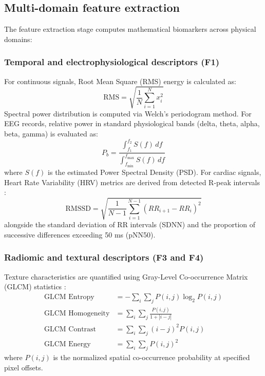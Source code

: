 \subsection{Multi-domain feature extraction}
The feature extraction stage computes mathematical biomarkers across physical domains:

\subsubsection{Temporal and electrophysiological descriptors (F1)}
For continuous signals, Root Mean Square (RMS) energy is calculated as:
\begin{equation}
\mathrm{RMS} = \sqrt{\frac{1}{N}\sum_{i=1}^{N}x_i^{2}}
\end{equation}
Spectral power distribution is computed via Welch's periodogram method. For EEG records, relative power in standard physiological bands (delta, theta, alpha, beta, gamma) is evaluated as:
\begin{equation}
P_b = \frac{\int_{f_1}^{f_2} S(f)\,df}{\int_{f_{\min}}^{f_{\max}} S(f)\,df}
\end{equation}
where $S(f)$ is the estimated Power Spectral Density (PSD). For cardiac signals, Heart Rate Variability (HRV) metrics are derived from detected R-peak intervals \cite{taskforce1996hrv, albuquerque2018ecg}:
\begin{equation}
\mathrm{RMSSD} = \sqrt{\frac{1}{N-1}\sum_{i=1}^{N-1}(RR_{i+1} - RR_i)^2}
\end{equation}
alongside the standard deviation of RR intervals (SDNN) and the proportion of successive differences exceeding 50 ms (pNN50).

\subsubsection{Radiomic and textural descriptors (F3 and F4)}
Texture characteristics are quantified using Gray-Level Co-occurrence Matrix (GLCM) statistics \cite{haralick1973glcm, lambin2012radiomics, vanGriethuysen2017pyradiomics}:
\begin{align}
\text{GLCM Entropy} & = -\sum_{i}\sum_{j} P(i,j) \log_2 P(i,j) \\
\text{GLCM Homogeneity} & = \sum_{i}\sum_{j} \frac{P(i,j)}{1 + |i - j|} \\
\text{GLCM Contrast} & = \sum_{i}\sum_{j} (i - j)^2 P(i,j) \\
\text{GLCM Energy} & = \sum_{i}\sum_{j} P(i,j)^2
\end{align}
where $P(i,j)$ is the normalized spatial co-occurrence probability at specified pixel offsets.

